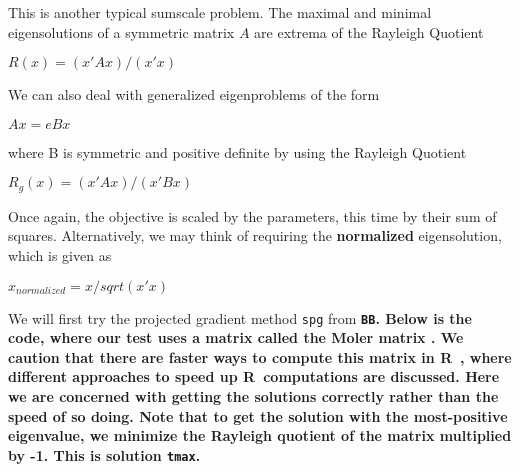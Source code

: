 \documentclass[11pt]{article}\usepackage[]{graphicx}\usepackage[]{color}
\newcommand{\B}[1]{{\bf #1 \rm}}
\newcommand{\R}{{\sf R}}
\newcommand{\code}[1]{{\tt#1}}
\newcommand{\pkg}[1]{\bf{\tt#1}\rm }
\begin{document}
This is another typical sumscale problem. 
The maximal and minimal eigensolutions of a symmetric matrix $A$ 
are extrema of the Rayleigh Quotient

$ R(x) =  (x' A x)  / (x' x) $

We can also deal with generalized eigenproblems of the form 

$A x = e B x$

where B is symmetric and positive definite by using the Rayleigh Quotient

$ R_g(x) =  (x' A x)  / (x' B x) $

Once again, the objective is scaled by the parameters, this time by their 
sum of squares. Alternatively, 
we may think of requiring the \B{normalized} eigensolution, which is given as 

$ x_{normalized} = x/sqrt(x' x) $

We will first try the projected gradient method \code{spg} from \pkg{BB}. 
Below is the code, where our test uses
a matrix called the Moler matrix \cite[Appendix 1]{cnm79}. We caution that there
are faster ways to compute this matrix in \R\, \citep{RQtimes12}, where different
approaches to speed up \R\ computations are discussed. Here we are concerned 
with getting the solutions correctly rather than the speed of so doing. Note
that to get the solution with the most-positive eigenvalue, we minimize the
Rayleigh quotient of the matrix multiplied by -1. This is solution \code{tmax}.
\end{document}

